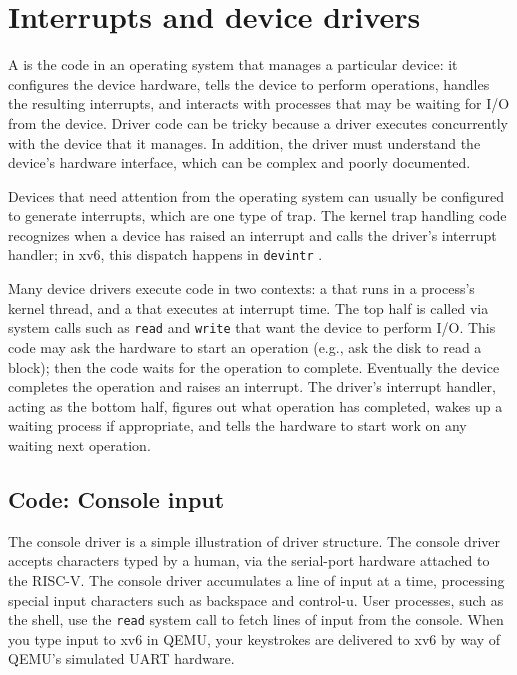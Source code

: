 \chapter{Interrupts and device drivers}
\label{CH:INTERRUPT}

A
is the code in an operating system that manages a particular device:
it configures the device hardware,
tells the device to perform operations,
handles the resulting interrupts,
and interacts with processes that may be waiting
for I/O from the device.
Driver code can be tricky
because a driver executes concurrently with the device that it manages.  In
addition, the driver must understand the device's hardware interface,
which can be complex and poorly documented.

Devices that need attention from the operating system can usually be
configured to generate interrupts, which are one type of trap.
The kernel trap handling code recognizes when a device
has raised an interrupt and calls the driver's interrupt handler;
in xv6, this dispatch happens in {\tt devintr} .

Many device drivers execute code in two contexts: a  that runs in a process's kernel thread, and a  that executes at interrupt time. The top half
is called via system calls such as {\tt read} and {\tt write} that want
the device to perform I/O. This code may ask the hardware to start an
operation (e.g., ask the disk to read a block); then the code waits for
the operation to complete. Eventually the device completes the
operation and raises an interrupt. The driver's interrupt handler,
acting as the bottom half,
figures out what operation has completed, wakes up a waiting
process if appropriate, and tells the hardware to start work
on any waiting next operation.

\section{Code: Console input}

The console driver 
is a simple illustration of driver structure. The
console driver accepts characters typed by a human, via the 
serial-port hardware attached to the RISC-V. The console driver accumulates a
line of input at a time, processing special input characters such as
backspace and control-u. User processes, such as the shell, use
the {\tt read} system call to fetch lines of input from the console.
When you type input to xv6 in QEMU, your keystrokes are delivered to
xv6 by way of QEMU's simulated UART hardware.

